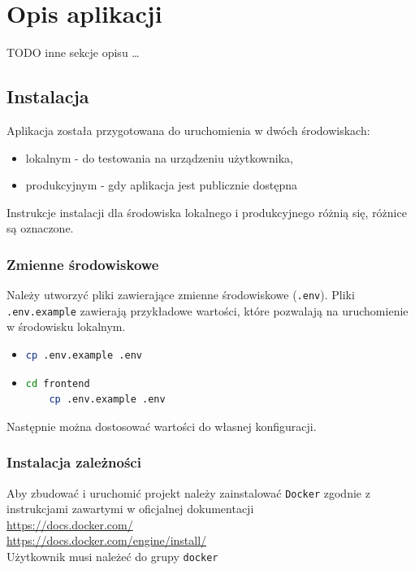 \documentclass[shortabstract]{iithesis}
\begin{document}
\chapter{Opis aplikacji}
TODO inne sekcje opisu \ldots
\section{Instalacja}
\noindent
Aplikacja została przygotowana do uruchomienia w dwóch środowiskach:
\begin{itemize}
    \item lokalnym - do testowania na urządzeniu użytkownika,
    \item produkcyjnym - gdy aplikacja jest publicznie dostępna
\end{itemize}
Instrukcje instalacji dla środowiska lokalnego i produkcyjnego różnią się, różnice są oznaczone.
\subsection{Zmienne środowiskowe}
\noindent
Należy utworzyć pliki zawierające zmienne środowiskowe (\texttt{.env}).
Pliki \texttt{.env.example} zawierają przykładowe wartości, które pozwalają na uruchomienie w środowisku lokalnym.
\begin{itemize}
    \item
          \begin{lstlisting}[language=bash]
    cp .env.example .env
    \end{lstlisting}

    \item
          \begin{lstlisting}[language=bash]
    cd frontend
    cp .env.example .env
    \end{lstlisting}
\end{itemize}
Następnie można dostosować wartości do własnej konfiguracji.


\subsection{Instalacja zależności}
Aby zbudować i uruchomić projekt należy zainstalować \texttt{Docker} zgodnie z instrukcjami zawartymi w oficjalnej dokumentacji
\\
\url{https://docs.docker.com/}
\\
\url{https://docs.docker.com/engine/install/}
\\
Użytkownik musi należeć do grupy \texttt{docker}
\end{document}
